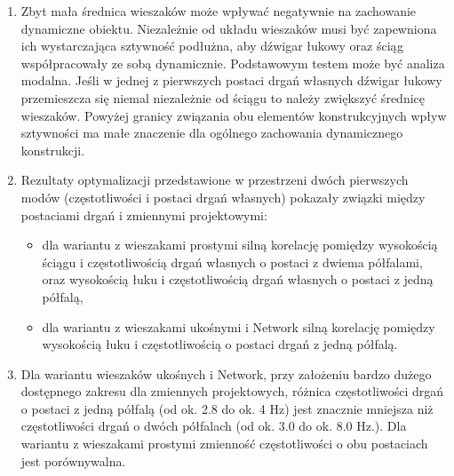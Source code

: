 \begin{enumerate}
\item Zbyt mała średnica wieszaków może wpływać negatywnie na zachowanie dynamiczne obiektu. Niezależnie od układu wieszaków musi być zapewniona ich wystarczająca sztywność podłużna, aby dźwigar łukowy oraz ściąg współpracowały ze sobą dynamicznie. Podstawowym testem może być analiza modalna. Jeśli w jednej z pierwszych postaci drgań własnych dźwigar łukowy przemieszcza się niemal niezależnie od ściągu to należy zwiększyć średnicę wieszaków. Powyżej granicy związania obu elementów konstrukcyjnych wpływ sztywności ma małe znaczenie dla ogólnego zachowania dynamicznego konstrukcji.

\item Rezultaty optymalizacji przedstawione w przestrzeni dwóch pierwszych modów (częstotliwości i postaci drgań własnych) pokazały związki między postaciami drgań i zmiennymi projektowymi:
\begin{itemize} 
	\item dla wariantu z wieszakami prostymi silną korelację pomiędzy wysokością ściągu i częstotliwością drgań własnych o postaci z dwiema półfalami, oraz wysokością łuku i częstotliwością drgań własnych o postaci z jedną półfalą,
	\item dla wariantu z wieszakami ukośnymi i Network silną korelację pomiędzy wysokością łuku i częstotliwością o postaci drgań z jedną półfalą.
\end{itemize}

\item Dla wariantu wieszaków ukośnych i Network, przy założeniu bardzo dużego dostępnego zakresu dla zmiennych projektowych, różnica częstotliwości drgań o postaci z jedną półfalą (od ok. 2.8 do ok. 4 Hz) jest znacznie mniejsza niż częstotliwości drgań o dwóch półfalach (od ok. 3.0 do ok. 8.0 Hz.). Dla wariantu z wieszakami prostymi zmienność częstotliwości o obu postaciach jest porównywalna.


\end{enumerate}
